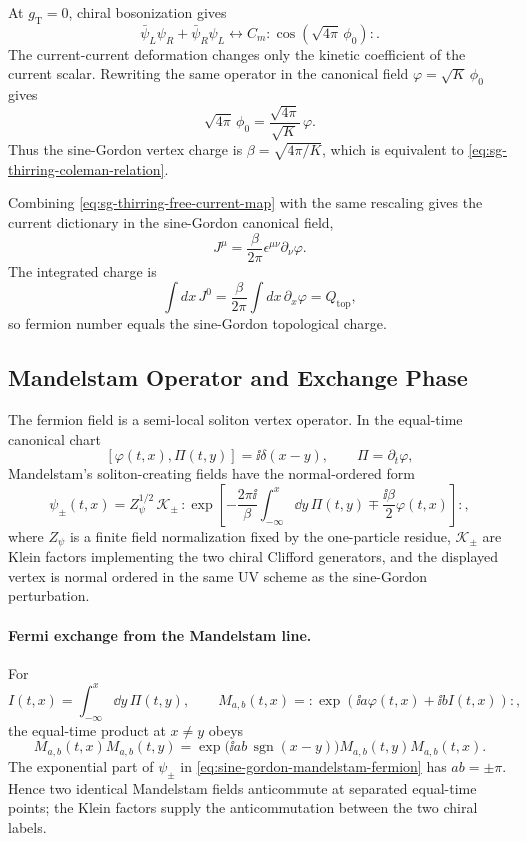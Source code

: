 At \(g_{\mathrm T}=0\), chiral bosonization gives
\[
  \bar\psi_L\psi_R+\bar\psi_R\psi_L
  \longleftrightarrow
  C_m:\!\cos(\sqrt{4\pi}\,\phi_0)\!: .
\]
The current-current deformation changes only the kinetic coefficient of the
current scalar.  Rewriting the same operator in the canonical field
\(\varphi=\sqrt K\,\phi_0\) gives
\[
  \sqrt{4\pi}\,\phi_0
  =
  \frac{\sqrt{4\pi}}{\sqrt K}\,\varphi .
\]
Thus the sine-Gordon vertex charge is
\(\beta=\sqrt{4\pi/K}\), which is equivalent to
\eqref{eq:sg-thirring-coleman-relation}.

Combining \eqref{eq:sg-thirring-free-current-map} with the same rescaling
gives the current dictionary in the sine-Gordon canonical field,
\begin{equation}
  J^\mu
  =
  \frac{\beta}{2\pi}\epsilon^{\mu\nu}\partial_\nu\varphi .
  \label{eq:sg-thirring-current-dictionary}
\end{equation}
The integrated charge is
\[
  \int dx\,J^0
  =
  \frac{\beta}{2\pi}
  \int dx\,\partial_x\varphi
  =
  Q_{\mathrm{top}},
\]
so fermion number equals the sine-Gordon topological charge.

\subsection{Mandelstam Operator and Exchange Phase}

The fermion field is a semi-local soliton vertex operator.  In the equal-time
canonical chart
\[
  [\varphi(t,x),\Pi(t,y)]=\ii\delta(x-y),
  \qquad
  \Pi=\partial_t\varphi ,
\]
Mandelstam's soliton-creating fields have the normal-ordered form
\begin{equation}
  \psi_{\pm}(t,x)
  =
  Z_\psi^{1/2}\,
  \mathcal K_\pm\,
  :\!\exp\left[
    -\frac{2\pi\ii}{\beta}
    \int_{-\infty}^{x}\dd y\,\Pi(t,y)
    \mp\frac{\ii\beta}{2}\varphi(t,x)
  \right]\!: ,
  \label{eq:sine-gordon-mandelstam-fermion}
\end{equation}
where \(Z_\psi\) is a finite field normalization fixed by the one-particle
residue, \(\mathcal K_\pm\) are Klein factors implementing the two chiral
Clifford generators, and the displayed vertex is normal ordered in the same
UV scheme as the sine-Gordon perturbation.

\paragraph{Fermi exchange from the Mandelstam line.}
For
\[
  I(t,x)=\int_{-\infty}^{x}\dd y\,\Pi(t,y),
  \qquad
  M_{a,b}(t,x)=:\!\exp(\ii a\varphi(t,x)+\ii bI(t,x))\!: ,
\]
the equal-time product at \(x\ne y\) obeys
\[
  M_{a,b}(t,x)M_{a,b}(t,y)
  =
  \exp\!\bigl(\ii ab\,\operatorname{sgn}(x-y)\bigr)
  M_{a,b}(t,y)M_{a,b}(t,x).
\]
The exponential part of \(\psi_\pm\) in
\eqref{eq:sine-gordon-mandelstam-fermion} has \(ab=\pm\pi\).  Hence two
identical Mandelstam fields anticommute at separated equal-time points; the
Klein factors supply the anticommutation between the two chiral labels.

